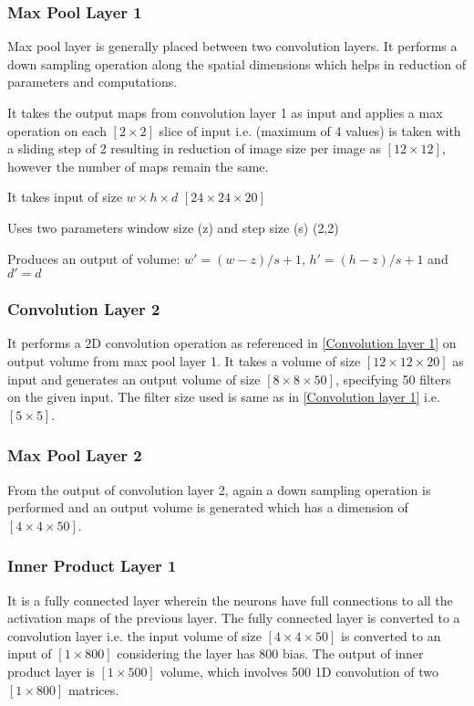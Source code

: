 \subsubsection{Max Pool Layer 1}\label{Max Pool layer 1}
Max pool layer is generally placed between two convolution layers. It performs a down sampling operation along the spatial dimensions which helps in reduction of parameters and computations. 

It takes the output maps from convolution layer 1 as input and applies a max operation on each $[2\times 2]$ slice of input i.e. (maximum of 4 values) is taken with a sliding step of 2 resulting in reduction of image size per image as $[12\times 12]$, however the number of maps remain the same.

\noindent It takes input of size $w\times h\times d$ $[24\times 24\times 20]$

\noindent Uses two parameters window size (z) and step size (s)  (2,2)

\noindent Produces an output of volume: $w'= (w-z)/s+1$, $h'= (h-z)/s+1$ and $d'=d$
\subsubsection{Convolution Layer 2}\label{Convolution layer 2}
It performs a 2D convolution operation as referenced in \ref{Convolution layer 1} on output volume from max pool layer 1. It takes a volume of size $[12\times 12\times 20]$ as input and generates an output volume of size $[8\times 8\times 50]$, specifying 50 filters on the given input. The filter size used is same as in \ref{Convolution layer 1} i.e. $[5\times 5]$.
\subsubsection{Max Pool Layer 2}\label{Max Pool layer 2}
From the output of convolution layer 2, again a down sampling operation is performed and an output volume is generated which has a dimension of $[4\times 4\times 50]$.
\subsubsection{Inner Product Layer 1}\label{Inner Product Layer 1}
It is a fully connected layer wherein the neurons have full connections to all the  activation maps of the previous layer. The fully connected layer is converted to a convolution layer i.e. the input volume of size $[4\times 4\times 50]$ is converted to an input of $[1\times 800]$ considering the layer has 800 bias. The output of inner product layer is $[1\times 500]$ volume, which  involves 500 1D convolution of two $[1\times 800]$ matrices.
